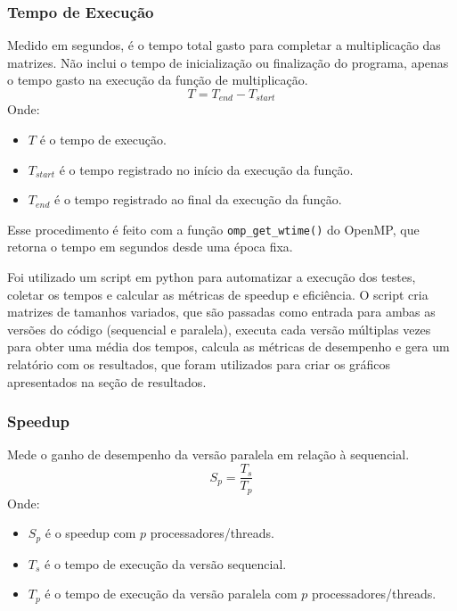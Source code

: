 \documentclass[12pt, a4paper]{article}
\begin{document}
    \subsubsection{Tempo de Execução}

    Medido em segundos, é o tempo total gasto para completar a multiplicação das matrizes.
    Não inclui o tempo de inicialização ou finalização do programa, apenas o tempo gasto na
    execução da função de multiplicação.
    \[
        T = T_{end} - T_{start}
    \]
    Onde:
    \begin{itemize}
        \item $T$ é o tempo de execução.
        \item $T_{start}$ é o tempo registrado no início da execução da função.
        \item $T_{end}$ é o tempo registrado ao final da execução da função.
    \end{itemize}

    Esse procedimento é feito com a função \texttt{omp\_get\_wtime()} do OpenMP, 
    que retorna o tempo em segundos desde uma época fixa.

    Foi utilizado um script em python para automatizar a execução dos testes,
    coletar os tempos e calcular as métricas de speedup e eficiência. O script
    cria matrizes de tamanhos variados, que são passadas como entrada para
    ambas as versões do código (sequencial e paralela), executa cada versão
    múltiplas vezes para obter uma média dos tempos, calcula as métricas
    de desempenho e gera um relatório com os resultados, que foram utilizados
    para criar os gráficos apresentados na seção de resultados.

	\subsubsection{Speedup}
	Mede o ganho de desempenho da versão paralela em relação à sequencial.
	\[
		S_{p} = \frac{T_{s}}{T_{p}}
	\]
	Onde:
	\begin{itemize}
		\item $S_{p}$ é o speedup com $p$ processadores/threads.

		\item $T_{s}$ é o tempo de execução da versão sequencial.

		\item $T_{p}$ é o tempo de execução da versão paralela com $p$ processadores/threads.
	\end{itemize}
\end{document}
